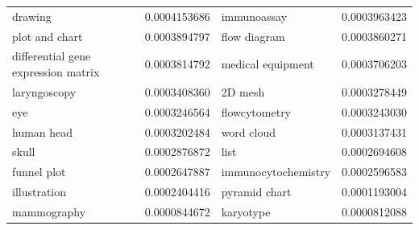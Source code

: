 \documentclass[11pt]{article}
\begin{document}
\begin{table}[htbp]
{\begin{tabular}{ll|ll}
drawing & 0.0004153686 & immunoassay & 0.0003963423 \\
plot and chart & 0.0003894797 & flow diagram & 0.0003860271 \\
differential gene expression matrix & 0.0003814792 & medical equipment & 0.0003706203 \\
laryngoscopy & 0.0003408360 & 2D mesh & 0.0003278449 \\
eye & 0.0003246564 & flowcytometry & 0.0003243030 \\
human head & 0.0003202484 & word cloud & 0.0003137431 \\
skull & 0.0002876872 & list & 0.0002694608 \\
funnel plot & 0.0002647887 & immunocytochemistry & 0.0002596583 \\
illustration & 0.0002404416 & pyramid chart & 0.0001193004 \\
mammography & 0.0000844672 & karyotype & 0.0000812088 \\
\hline
\end{tabular}
}
\end{table}
\end{document}
